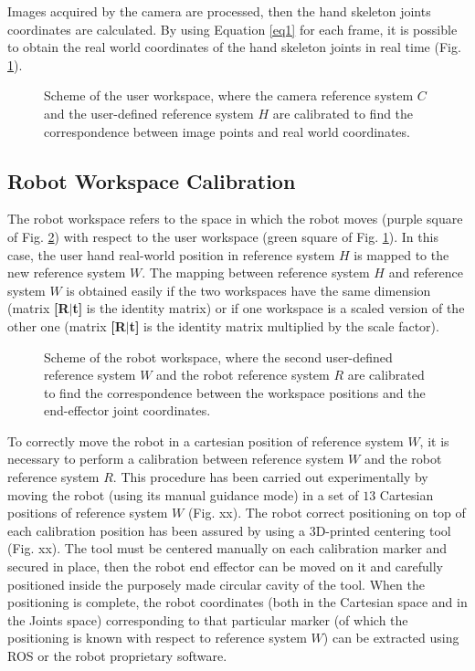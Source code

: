 \documentclass[letterpaper, 10 pt, conference]{ieeeconf}  %
\begin{document}
Images acquired by the camera are processed, then the hand skeleton joints coordinates are calculated. By using Equation \ref{eq1} for each frame, it is possible to obtain the real world coordinates of the hand skeleton joints in real time (Fig. \ref{fig:w1}).

\begin{figure} [h!]
  \centering
  \caption{Scheme of the user workspace, where the camera reference system $C$ and the user-defined reference system $H$ are calibrated to find the correspondence between image points and real world coordinates.}
  \label{fig:w1}
\end{figure}


\subsection{Robot Workspace Calibration}
The robot workspace refers to the space in which the robot moves (purple square of Fig. \ref{fig:w2}) with respect to the user workspace (green square of Fig. \ref{fig:w1}). In this case, the user hand real-world position in reference system $H$ is mapped to the new reference system $W$. The mapping between reference system $H$ and reference system $W$ is obtained easily if the two workspaces have the same dimension (matrix \textbf{[R$|$t]} is the identity matrix) or if one workspace is a scaled version of the other one (matrix \textbf{[R$|$t]} is the identity matrix multiplied by the scale factor). %

\begin{figure} [h!]
  \centering
  \caption{Scheme of the robot workspace, where the second user-defined reference system $W$ and the robot reference system $R$ are calibrated to find the correspondence between the workspace positions and the end-effector joint coordinates.}
  \label{fig:w2}
\end{figure}

To correctly move the robot in a cartesian position of reference system $W$, it is necessary to perform a calibration between reference system $W$ and the robot reference system $R$. This procedure has been carried out experimentally by moving the robot (using its manual guidance mode) in a set of $13$ Cartesian positions of reference system $W$ (Fig. xx). %
The robot correct positioning on top of each calibration position has been assured by using a 3D-printed centering tool (Fig. xx). The tool must be centered manually on each calibration marker and secured in place, then the robot end effector can be moved on it and carefully positioned inside the purposely made circular cavity of the tool. When the positioning is complete, the robot coordinates (both in the Cartesian space and in the Joints space) corresponding to that particular marker (of which the positioning is known with respect to reference system $W$) can be extracted using ROS or the robot proprietary software.
\end{document}
